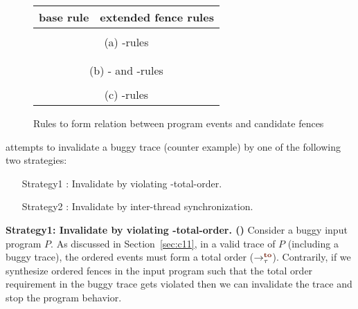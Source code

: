 \begin{figure}[t]
	\begin{tabular}{|c||c|c|c|}
		\multicolumn{1}{c}{base rule} & 
		\multicolumn{3}{c}{extended fence rules} \\\hline
		
		\resizebox{0.24\textwidth}{!}{} &
		\resizebox{0.24\textwidth}{!}{} &
		\resizebox{0.24\textwidth}{!}{} &
		\resizebox{0.24\textwidth}{!}{} \\
		\hline
		\multicolumn{4}{c}{(a) \lso-rules} \\
		\hline
		
		\resizebox{0.24\textwidth}{!}{} &
		\resizebox{0.24\textwidth}{!}{} &
		\resizebox{0.24\textwidth}{!}{} &
		\resizebox{0.24\textwidth}{!}{} \\
		
		\resizebox{0.24\textwidth}{!}{} &
		\resizebox{0.24\textwidth}{!}{} &&\\
		\hline
		\multicolumn{4}{c}{(b) \lsw- and \ldob-rules} \\
		\hline
		
		\resizebox{0.24\textwidth}{!}{} &
		\resizebox{0.24\textwidth}{!}{} & 
		\resizebox{0.24\textwidth}{!}{} &
		\resizebox{0.24\textwidth}{!}{} \\
		\hline
		\multicolumn{4}{c}{(c) \lws-rules} \\	
	\end{tabular}
	\caption{Rules to form relation between program events and 
		candidate fences}
	\label{fig:so rules}
\end{figure}

\ourtechnique attempts to invalidate a buggy trace (\aka counter
example) by one of the following two strategies:
\begin{itemize}[label=strategy1,align=left,leftmargin=*]
	\item [Strategy1]:
		Invalidate by violating \sc-total-order.
	\item [Strategy2]:
		Invalidate by inter-thread synchronization.
\end{itemize}

\noindent
{\bf Strategy1: Invalidate by violating \sc-total-order. 
	(\sfence)}\newline
Consider a buggy input program $P$.
%
As discussed in Section~\ref{sec:c11}, in a valid trace of $P$ 
(including a buggy trace), 
the \sc ordered events must form a total order ($\setTO$).
%
Contrarily, if we synthesize \sc ordered fences in the input program 
such that the total order requirement in the buggy trace gets violated 
then we can invalidate the trace and stop the program behavior.

